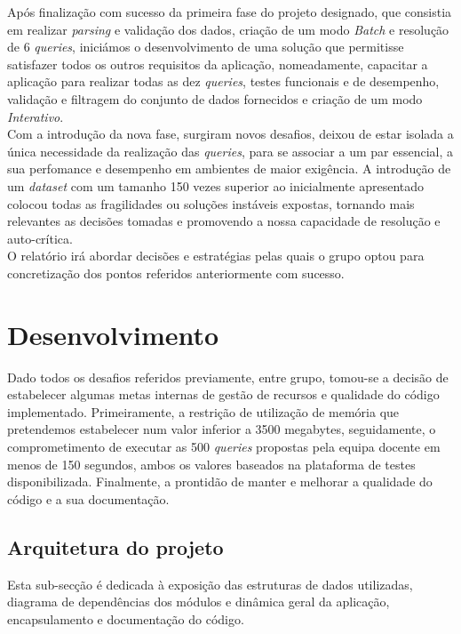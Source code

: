 \documentclass[12pt,a4paper]{article}
\begin{document}
    Após finalização com sucesso da primeira fase do projeto designado, que consistia em realizar \textit{parsing} e validação dos dados, criação de um modo \textit{Batch} e resolução de 6 \textit{queries}, iniciámos o desenvolvimento de uma solução que permitisse satisfazer todos os outros requisitos da aplicação, nomeadamente, capacitar a aplicação para realizar todas as dez \textit{queries}, testes funcionais
    e de desempenho, validação e filtragem do conjunto de dados fornecidos e criação de um modo \textit{Interativo}. \\

    Com a introdução da nova fase, surgiram novos desafios, deixou de estar isolada a única necessidade da realização das \textit{queries}, para se associar a um par essencial, a sua perfomance e desempenho em ambientes de maior exigência. A introdução de um \textit{dataset} com um tamanho 150 vezes superior ao inicialmente apresentado colocou todas as fragilidades ou soluções instáveis expostas, tornando mais relevantes as decisões tomadas e promovendo a nossa capacidade de resolução e auto-crítica. \\
        
    O relatório irá abordar decisões e estratégias pelas quais o grupo optou para concretização dos pontos referidos anteriormente com sucesso.
         
    \section{Desenvolvimento}
    \hspace{0,6cm}Dado todos os desafios referidos previamente, entre grupo, tomou-se a decisão de estabelecer algumas metas internas de gestão de recursos e qualidade do código implementado. Primeiramente, a restrição de utilização de memória que pretendemos estabelecer num valor inferior a 3500 megabytes, seguidamente, o comprometimento de executar as 500 \textit{queries} propostas pela equipa docente em menos de 150 segundos, ambos os valores baseados na plataforma de testes disponibilizada. Finalmente, a prontidão de manter e melhorar a qualidade do código e a sua documentação.

    \subsection{Arquitetura do projeto}

    \hspace{0,6cm}Esta sub-secção é dedicada à exposição das estruturas de dados utilizadas, diagrama de dependências dos módulos e dinâmica geral da aplicação, encapsulamento e documentação do código.
    
\end{document}
